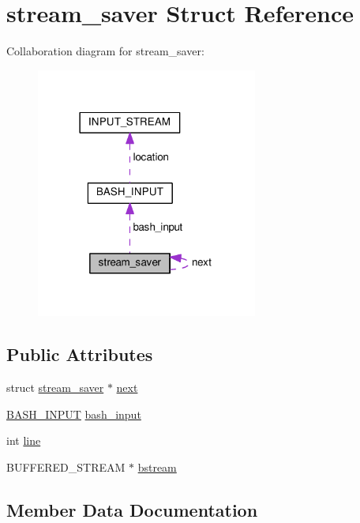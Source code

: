 \hypertarget{structstream__saver}{}\section{stream\+\_\+saver Struct Reference}
\label{structstream__saver}


Collaboration diagram for stream\+\_\+saver\+:
\nopagebreak
\begin{figure}[H]
\begin{center}
\leavevmode
\includegraphics[width=206pt]{structstream__saver__coll__graph}
\end{center}
\end{figure}
\subsection*{Public Attributes}
\begin{DoxyCompactItemize}
\item 
struct \hyperlink{structstream__saver}{stream\+\_\+saver} $\ast$ \hyperlink{structstream__saver_af27ac3238525fc36f8165d8a879c8b68}{next}
\item 
\hyperlink{structBASH__INPUT}{B\+A\+S\+H\+\_\+\+I\+N\+P\+UT} \hyperlink{structstream__saver_a289a85e33c449e20e186233f355629db}{bash\+\_\+input}
\item 
int \hyperlink{structstream__saver_ae65e97941be54e749139a5d4722d96d9}{line}
\item 
B\+U\+F\+F\+E\+R\+E\+D\+\_\+\+S\+T\+R\+E\+AM $\ast$ \hyperlink{structstream__saver_a16ca697c6be794b7b0d4cc1919c057db}{bstream}
\end{DoxyCompactItemize}


\subsection{Member Data Documentation}
